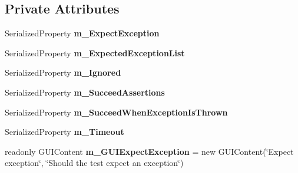 \subsection*{Private Attributes}
\begin{DoxyCompactItemize}
\item 
\mbox{\label{class_unity_test_1_1_test_component_editor_a174291514f73b84017f5fc24a020c920}} 
Serialized\+Property {\bfseries m\+\_\+\+Expect\+Exception}
\item 
\mbox{\label{class_unity_test_1_1_test_component_editor_a4f022f5a5c8fda240c73f910ff46ca2c}} 
Serialized\+Property {\bfseries m\+\_\+\+Expected\+Exception\+List}
\item 
\mbox{\label{class_unity_test_1_1_test_component_editor_a6b896c0c4ee0ceedeab09006b8ad0c0d}} 
Serialized\+Property {\bfseries m\+\_\+\+Ignored}
\item 
\mbox{\label{class_unity_test_1_1_test_component_editor_afcd90690e406a2ed31805a38b6efa681}} 
Serialized\+Property {\bfseries m\+\_\+\+Succeed\+Assertions}
\item 
\mbox{\label{class_unity_test_1_1_test_component_editor_a17ec86cde3c5b3b0791b766361d77c4d}} 
Serialized\+Property {\bfseries m\+\_\+\+Succeed\+When\+Exception\+Is\+Thrown}
\item 
\mbox{\label{class_unity_test_1_1_test_component_editor_a5dcfe60d845351c411451e562e0826d1}} 
Serialized\+Property {\bfseries m\+\_\+\+Timeout}
\item 
\mbox{\label{class_unity_test_1_1_test_component_editor_aa60f2e3d33e44e34838f88d436fbbdb2}} 
readonly G\+U\+I\+Content {\bfseries m\+\_\+\+G\+U\+I\+Expect\+Exception} = new G\+U\+I\+Content(\char`\"{}Expect exception\char`\"{}, \char`\"{}Should the test expect an exception\char`\"{})
\item 
\mbox{\label{class_unity_test_1_1_test_component_editor_abdb581435ad57ae72cdb6e40a25e358c}} 

\end{DoxyCompactItemize}
